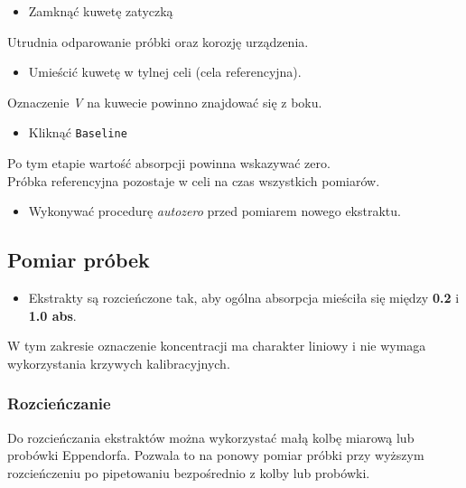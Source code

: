\documentclass[
  letterpaper,
  DIV=11,
  numbers=noendperiod]{scrreprt}
\providecommand{\tightlist}{%
  \setlength{\itemsep}{0pt}\setlength{\parskip}{0pt}}\usepackage{longtable,booktabs,array}
\begin{document}
\begin{itemize}
\tightlist
\item
  Zamknąć kuwetę zatyczką
\end{itemize}

Utrudnia odparowanie próbki oraz korozję urządzenia.

\begin{itemize}
\tightlist
\item
  Umieścić kuwetę w tylnej celi (cela referencyjna).
\end{itemize}

Oznaczenie \emph{V} na kuwecie powinno znajdować się z boku.

\begin{itemize}
\tightlist
\item
  Kliknąć \texttt{Baseline}
\end{itemize}

Po tym etapie wartość absorpcji powinna wskazywać zero.\\
Próbka referencyjna pozostaje w celi na czas wszystkich pomiarów.

\begin{itemize}
\tightlist
\item
  Wykonywać procedurę \emph{autozero} przed pomiarem nowego ekstraktu.
\end{itemize}

\hypertarget{pomiar-pruxf3bek}{%
\subsection{Pomiar próbek}\label{pomiar-pruxf3bek}}

\begin{itemize}
\tightlist
\item
  Ekstrakty są rozcieńczone tak, aby ogólna absorpcja mieściła się
  między \textbf{0.2} i \textbf{1.0 abs}.
\end{itemize}

W tym zakresie oznaczenie koncentracji ma charakter liniowy i nie wymaga
wykorzystania krzywych kalibracyjnych.

\hypertarget{rozcieux144czanie}{%
\subsubsection{Rozcieńczanie}\label{rozcieux144czanie}}

Do rozcieńczania ekstraktów można wykorzystać małą kolbę miarową lub
probówki Eppendorfa. Pozwala to na ponowy pomiar próbki przy wyższym
rozcieńczeniu po pipetowaniu bezpośrednio z kolby lub probówki.
\end{document}
